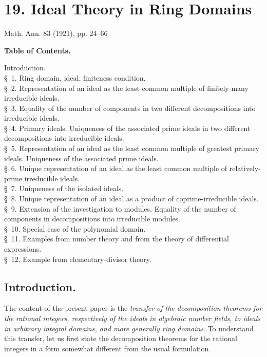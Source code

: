 \documentclass[11pt]{article}
\begin{document}
\clearpage

\setcounter{footnote}{0}
\section*{19. Ideal Theory in Ring Domains}
\begin{center}
Math. Ann. 83 (1921), pp. 24--66
\end{center}

\begin{center}\textbf{Table of Contents.}\end{center}
\noindent Introduction.\\
\S~1. Ring domain, ideal, finiteness condition.\\
\S~2. Representation of an ideal as the least common multiple of finitely many irreducible ideals.\\
\S~3. Equality of the number of components in two different decompositions into irreducible ideals.\\
\S~4. Primary ideals. Uniqueness of the associated prime ideals in two different decompositions into irreducible ideals.\\
\S~5. Representation of an ideal as the least common multiple of greatest primary ideals. Uniqueness of the associated prime ideals.\\
\S~6. Unique representation of an ideal as the least common multiple of relatively-prime irreducible ideals.\\
\S~7. Uniqueness of the isolated ideals.\\
\S~8. Unique representation of an ideal as a product of coprime-irreducible ideals.\\
\S~9. Extension of the investigation to modules. Equality of the number of components in decompositions into irreducible modules.\\
\S~10. Special case of the polynomial domain.\\
\S~11. Examples from number theory and from the theory of differential expressions.\\
\S~12. Example from elementary-divisor theory.

\subsection*{Introduction.}
The content of the present paper is the \emph{transfer of the decomposition theorems for the rational integers, respectively of the ideals in algebraic number fields, to ideals in arbitrary integral domains, and more generally ring domains}. To understand this transfer, let us first state the decomposition theorems for the rational integers in a form somewhat different from the usual formulation.
\end{document}
